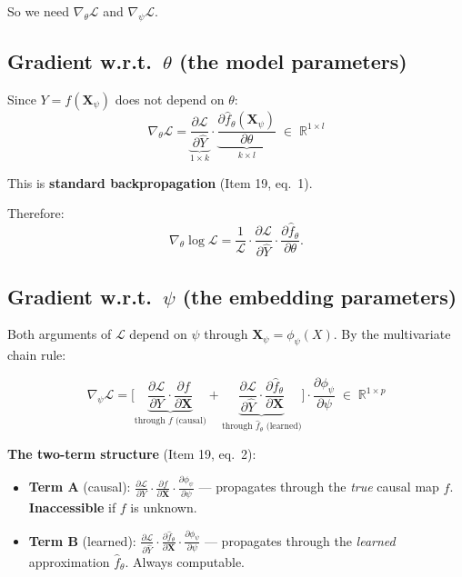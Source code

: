 \documentclass[11pt,a4paper]{article}
\newcommand{\R}{\mathbb{R}}
\newcommand{\calL}{\mathcal{L}}
\newcommand{\bX}{\mathbf{X}}
\begin{document}
So we need $\nabla_\theta \calL$ and $\nabla_\psi \calL$.

\subsection{Gradient w.r.t.\ $\theta$ (the model parameters)}

Since $Y = f(\bX_\psi)$ does not depend on $\theta$:
\begin{equation}
\boxed{
\nabla_\theta \calL = \underbrace{\frac{\partial \calL}{\partial \hat{Y}}}_{1 \times k} \cdot \underbrace{\frac{\partial \hat{f}_\theta(\bX_\psi)}{\partial \theta}}_{k \times l} \;\in\; \R^{1 \times l}
}
\label{eq:grad-theta}
\end{equation}

This is \textbf{standard backpropagation} (Item 19, eq.~1).

Therefore:
\begin{equation}
\nabla_\theta \log \calL = \frac{1}{\calL} \cdot \frac{\partial \calL}{\partial \hat{Y}} \cdot \frac{\partial \hat{f}_\theta}{\partial \theta}.
\label{eq:log-grad-theta}
\end{equation}

\subsection{Gradient w.r.t.\ $\psi$ (the embedding parameters)}

Both arguments of $\calL$ depend on $\psi$ through $\bX_\psi = \phi_\psi(X)$. By the multivariate chain rule:

\begin{equation}
\boxed{
\nabla_\psi \calL = \bigg[\underbrace{\frac{\partial \calL}{\partial Y} \cdot \frac{\partial f}{\partial \bX}}_{\text{through } f \text{ (causal)}} + \underbrace{\frac{\partial \calL}{\partial \hat{Y}} \cdot \frac{\partial \hat{f}_\theta}{\partial \bX}}_{\text{through } \hat{f}_\theta \text{ (learned)}}\bigg] \cdot \frac{\partial \phi_\psi}{\partial \psi} \;\in\; \R^{1 \times p}
}
\label{eq:grad-psi}
\end{equation}

\textbf{The two-term structure} (Item 19, eq.~2):
\begin{itemize}[nosep]
\item \textbf{Term A} (causal): $\frac{\partial \calL}{\partial Y} \cdot \frac{\partial f}{\partial \bX} \cdot \frac{\partial \phi_\psi}{\partial \psi}$ — propagates through the \emph{true} causal map $f$. \textbf{Inaccessible} if $f$ is unknown.
\item \textbf{Term B} (learned): $\frac{\partial \calL}{\partial \hat{Y}} \cdot \frac{\partial \hat{f}_\theta}{\partial \bX} \cdot \frac{\partial \phi_\psi}{\partial \psi}$ — propagates through the \emph{learned} approximation $\hat{f}_\theta$. Always computable.
\end{itemize}
\end{document}
